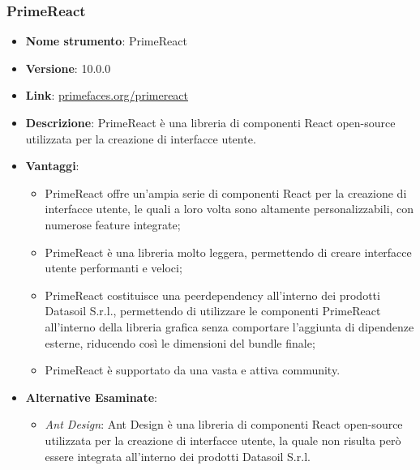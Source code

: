 \subsubsection{PrimeReact}
\begin{itemize}
      \item \textbf{Nome strumento}: PrimeReact
      \item \textbf{Versione}: 10.0.0
      \item \textbf{Link}: \href{https://primefaces.org/primereact}{primefaces.org/primereact}
      \item \textbf{Descrizione}: PrimeReact è una libreria di componenti React open-source utilizzata per la creazione di interfacce utente.
      \item \textbf{Vantaggi}:
            \begin{itemize}
                  \item PrimeReact offre un'ampia serie di componenti React per la creazione di interfacce utente, le quali a loro volta sono altamente personalizzabili, con numerose feature integrate;
                  \item PrimeReact è una libreria molto leggera, permettendo di creare interfacce utente performanti e veloci;
                  \item PrimeReact costituisce una peerdependency all'interno dei prodotti Datasoil S.r.l., permettendo di utilizzare le componenti PrimeReact all'interno
                        della libreria grafica senza comportare l'aggiunta di dipendenze esterne, riducendo così le dimensioni del bundle finale;
                  \item PrimeReact è supportato da una vasta e attiva community.
            \end{itemize}
      \item \textbf{Alternative Esaminate}:
            \begin{itemize}
                  \item \textit{Ant Design}: Ant Design è una libreria di componenti React open-source utilizzata per la creazione di interfacce utente, la quale non risulta però
                        essere integrata all'interno dei prodotti Datasoil S.r.l.
            \end{itemize}
\end{itemize}



